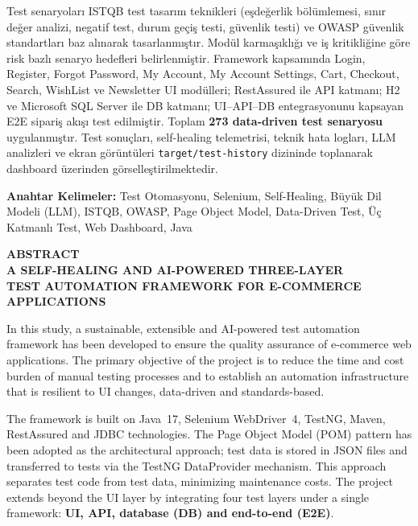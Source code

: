 Test senaryoları ISTQB test tasarım teknikleri (eşdeğerlik bölümlemesi, sınır değer analizi, negatif test, durum geçiş testi, güvenlik testi) ve OWASP güvenlik standartları baz alınarak tasarlanmıştır. Modül karmaşıklığı ve iş kritikliğine göre risk bazlı senaryo hedefleri belirlenmiştir. Framework kapsamında Login, Register, Forgot Password, My Account, My Account Settings, Cart, Checkout, Search, WishList ve Newsletter UI modülleri; RestAssured ile API katmanı; H2 ve Microsoft SQL Server ile DB katmanı; UI--API--DB entegrasyonunu kapsayan E2E sipariş akışı test edilmiştir. Toplam \textbf{273 data-driven test senaryosu} uygulanmıştır. Test sonuçları, self-healing telemetrisi, teknik hata logları, LLM analizleri ve ekran görüntüleri \texttt{target/test-history} dizininde toplanarak dashboard üzerinden görselleştirilmektedir.

\vspace{2cm}
\textbf{Anahtar Kelimeler:} Test Otomasyonu, Selenium, Self-Healing, Büyük Dil Modeli (LLM), ISTQB, OWASP, Page Object Model, Data-Driven Test, Üç Katmanlı Test, Web Dashboard, Java

\newpage

{}
\begin{center}
\textbf{\large ABSTRACT}\\[0.4em]
\textbf{A SELF-HEALING AND AI-POWERED THREE-LAYER\\
TEST AUTOMATION FRAMEWORK FOR E-COMMERCE APPLICATIONS}
\end{center}

In this study, a sustainable, extensible and AI-powered test automation framework has been developed to ensure the quality assurance of e-commerce web applications. The primary objective of the project is to reduce the time and cost burden of manual testing processes and to establish an automation infrastructure that is resilient to UI changes, data-driven and standards-based.

The framework is built on Java~17, Selenium WebDriver~4, TestNG, Maven, RestAssured and JDBC technologies. The Page Object Model (POM) pattern has been adopted as the architectural approach; test data is stored in JSON files and transferred to tests via the TestNG DataProvider mechanism. This approach separates test code from test data, minimizing maintenance costs. The project extends beyond the UI layer by integrating four test layers under a single framework: \textbf{UI, API, database (DB) and end-to-end (E2E)}.

